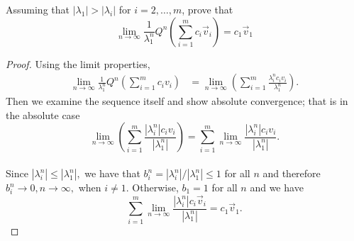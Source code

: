 \documentclass[letter]{article}
\newenvironment{menumerate}{\edef\backupindent{\the\parindent}
  \enumerate\setlength{\parindent}{\backupindent}}
  {\endenumerate}
\begin{document}
\begin{menumerate}
\begin{menumerate}
        \item
            Assuming that $|\lambda_1| > |\lambda_i|$ for $i=2,\dots, m$,
            prove that
            \begin{equation*}
                \lim_{n\to\infty} \frac{1}{\lambda_1^n}Q^n \left(\sum_{i=1}^m c_i\vec{v}_i \right) = c_1 \vec{v}_1
            \end{equation*}
        \begin{proof}
            Using the limit properties,
            \begin{equation*}
                \begin{aligned}
                    \lim_{n\to\infty} \frac{1}{\lambda_1^n}Q^n \left(\sum_{i=1}^m c_iv_i \right) &=   \lim_{n\to\infty} \left(\sum_{i=1}^m \frac{\lambda_i^n c_iv_i}{\lambda_1^n} \right).
                \end{aligned}
            \end{equation*}
            Then we examine the sequence itself and show absolute convergence; that is in the absolute case
            \begin{equation*}
                \lim_{n\to\infty} \left(\sum_{i=1}^m \frac{|\lambda_i^n| c_iv_i}{|\lambda_1^n|} \right) = \sum_{i=1}^m \lim_{n\to\infty}\frac{|\lambda_i^n| c_iv_i}{|\lambda_1^n|}.
            \end{equation*}
        \\Since $|\lambda_i^n| \leq |\lambda_1^n|,$ we have that $b_i^n = |\lambda_i^n|/|\lambda_1^n| \leq 1$ for all $n$ and therefore $b_i^n \to 0, n \to \infty,$ when $i \neq 1.$ Otherwise, $b_1 = 1$ for all $n$ and we have
        \begin{equation*}
         \sum_{i=1}^m \lim_{n\to\infty}\frac{|\lambda_i^n| c_i\vec{v}_i}{|\lambda_1^n|} = c_1\vec{v}_1.
        \end{equation*}
        \end{proof}


\end{menumerate}
\end{menumerate}
\end{document}
